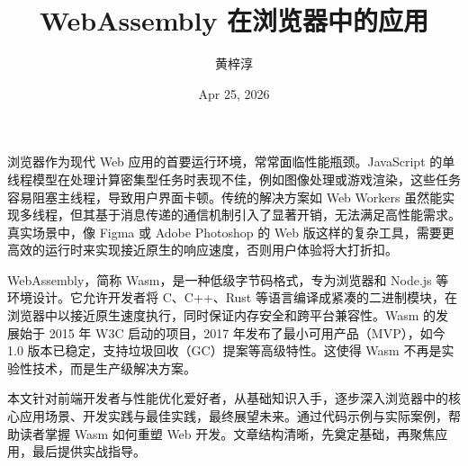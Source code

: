 \title{WebAssembly 在浏览器中的应用}
\author{黄梓淳}
\date{Apr 25, 2026}
\maketitle
浏览器作为现代 Web 应用的首要运行环境，常常面临性能瓶颈。JavaScript 的单线程模型在处理计算密集型任务时表现不佳，例如图像处理或游戏渲染，这些任务容易阻塞主线程，导致用户界面卡顿。传统的解决方案如 Web Workers 虽然能实现多线程，但其基于消息传递的通信机制引入了显著开销，无法满足高性能需求。真实场景中，像 Figma 或 Adobe Photoshop 的 Web 版这样的复杂工具，需要更高效的运行时来实现接近原生的响应速度，否则用户体验将大打折扣。\par
WebAssembly，简称 Wasm，是一种低级字节码格式，专为浏览器和 Node.js 等环境设计。它允许开发者将 C、C++、Rust 等语言编译成紧凑的二进制模块，在浏览器中以接近原生速度执行，同时保证内存安全和跨平台兼容性。Wasm 的发展始于 2015 年 W3C 启动的项目，2017 年发布了最小可用产品（MVP），如今 1.0 版本已稳定，支持垃圾回收（GC）提案等高级特性。这使得 Wasm 不再是实验性技术，而是生产级解决方案。\par
本文针对前端开发者与性能优化爱好者，从基础知识入手，逐步深入浏览器中的核心应用场景、开发实践与最佳实践，最终展望未来。通过代码示例与实际案例，帮助读者掌握 Wasm 如何重塑 Web 开发。文章结构清晰，先奠定基础，再聚焦应用，最后提供实战指导。\par
